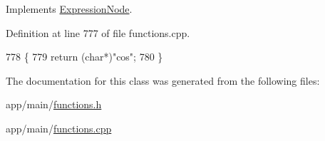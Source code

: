 Implements \hyperlink{classExpressionNode_a42a5e9562b0f645a19dcc83f698069b5}{Expression\+Node}.



Definition at line 777 of file functions.\+cpp.


\begin{DoxyCode}
778 \{
779     \textcolor{keywordflow}{return} (\textcolor{keywordtype}{char}*)\textcolor{stringliteral}{"cos"};
780 \}
\end{DoxyCode}


The documentation for this class was generated from the following files\+:\begin{DoxyCompactItemize}
\item 
app/main/\hyperlink{functions_8h}{functions.\+h}\item 
app/main/\hyperlink{functions_8cpp}{functions.\+cpp}\end{DoxyCompactItemize}
